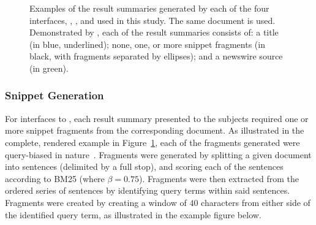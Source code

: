 \begin{figure}[t!]
    \centering
    \caption[Examples of result summaries across experimental interfaces]{Examples of the result summaries generated by each of the four interfaces, , ,  and  used in this study. The same document is used. Demonstrated by \searchlogo, each of the result summaries consists of: a title (in blue, underlined); none, one, or more snippet fragments (in black, with fragments separated by ellipses); and a newswire source (in green).}
    \label{fig:interface_snippets}
\end{figure}

\subsubsection{Snippet Generation}\label{sec:snippets:method:snippets}
For interfaces  to , each result summary presented to the subjects required one or more snippet fragments from the corresponding document. As illustrated in the complete, rendered example in Figure~\ref{fig:interface_snippets}, each of the fragments generated were query-biased in nature~\citep{tombros1998query_biased}. Fragments were generated by splitting a given document into sentences (delimited by a full stop), and scoring each of the sentences according to BM25 (where $\beta=0.75$). Fragments were then extracted from the ordered series of sentences by identifying query terms within said sentences. Fragments were created by creating a window of $40$ characters from either side of the identified query term, as illustrated in the example figure below.

\begin{figure}[h]
    \centering
    \vspace{4mm}
    \label{fig:fragment_example}
    \vspace{-5mm}
\end{figure}

